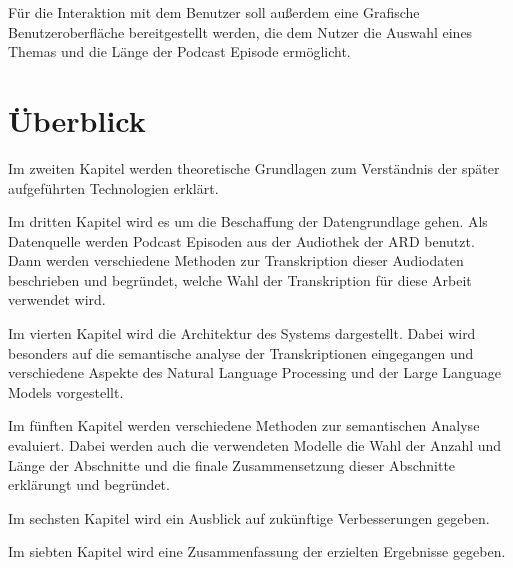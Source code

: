 Für die Interaktion mit dem Benutzer soll außerdem eine Grafische Benutzeroberfläche bereitgestellt werden, die dem Nutzer die Auswahl eines Themas und die Länge der Podcast  Episode ermöglicht.

\section{Überblick}

Im zweiten Kapitel werden theoretische Grundlagen zum Verständnis der später aufgeführten Technologien erklärt.

Im dritten Kapitel wird es um die Beschaffung der Datengrundlage gehen. 
Als Datenquelle werden Podcast Episoden aus der Audiothek der ARD benutzt. 
Dann werden verschiedene Methoden zur Transkription dieser Audiodaten beschrieben und begründet, welche Wahl der Transkription für diese Arbeit verwendet wird.

Im vierten Kapitel wird die Architektur des Systems dargestellt. 
Dabei wird besonders auf die semantische analyse der Transkriptionen eingegangen und verschiedene Aspekte des Natural Language Processing und der Large Language Models vorgestellt.

Im fünften Kapitel werden verschiedene Methoden zur semantischen Analyse evaluiert.
Dabei werden auch die verwendeten Modelle die Wahl der Anzahl und Länge der Abschnitte und die finale Zusammensetzung dieser Abschnitte erklärungt und begründet.

Im sechsten Kapitel wird ein Ausblick auf zukünftige Verbesserungen gegeben.

Im siebten Kapitel wird eine Zusammenfassung der erzielten Ergebnisse gegeben.
